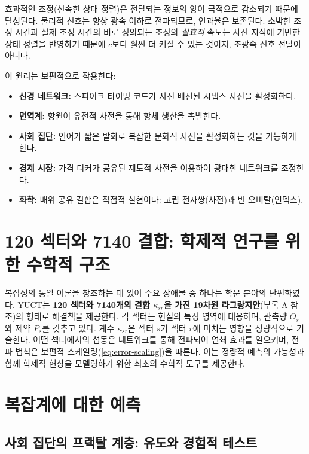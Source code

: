 \documentclass[11pt,a4paper]{article}
\theoremstyle{remark}
\begin{document}
	효과적인 조정(신속한 상태 정렬)은 전달되는 정보의 양이 극적으로 감소되기 때문에 달성된다. 물리적 신호는 항상 광속 이하로 전파되므로, 인과율은 보존된다. 소박한 조정 시간과 실제 조정 시간의 비로 정의되는 조정의 \emph{실효적} 속도는 사전 지식에 기반한 상태 정렬을 반영하기 때문에 \(c\)보다 훨씬 더 커질 수 있는 것이지, 초광속 신호 전달이 아니다.
	
	이 원리는 보편적으로 작용한다:
	\begin{itemize}
		\item \textbf{신경 네트워크:} 스파이크 타이밍 코드가 사전 배선된 시냅스 사전을 활성화한다.
		\item \textbf{면역계:} 항원이 유전적 사전을 통해 항체 생산을 촉발한다.
		\item \textbf{사회 집단:} 언어가 짧은 발화로 복잡한 문화적 사전을 활성화하는 것을 가능하게 한다.
		\item \textbf{경제 시장:} 가격 티커가 공유된 제도적 사전을 이용하여 광대한 네트워크를 조정한다.
		\item \textbf{화학:} 배위 공유 결합은 직접적 실현이다: 고립 전자쌍(사전)과 빈 오비탈(인덱스).
	\end{itemize}
	
	\section{120 섹터와 7140 결합: 학제적 연구를 위한 수학적 구조}
	\label{sec:sectors}
	
	복잡성의 통일 이론을 창조하는 데 있어 주요 장애물 중 하나는 학문 분야의 단편화였다. YUCT는 \textbf{120 섹터와 7140개의 결합 \(\kappa_{sr}\)을 가진 19차원 라그랑지안}(부록 A 참조)의 형태로 해결책을 제공한다. 각 섹터는 현실의 특정 영역에 대응하며, 관측량 \(O_s\)와 제약 \(P_s\)를 갖추고 있다. 계수 \(\kappa_{sr}\)은 섹터 \(s\)가 섹터 \(r\)에 미치는 영향을 정량적으로 기술한다. 어떤 섹터에서의 섭동은 네트워크를 통해 전파되어 연쇄 효과를 일으키며, 전파 법칙은 보편적 스케일링(\ref{eq:error-scaling})을 따른다. 이는 정량적 예측의 가능성과 함께 학제적 현상을 모델링하기 위한 최초의 수학적 도구를 제공한다.
	
	\section{복잡계에 대한 예측}
	\label{sec:predictions}
	
	\subsection{사회 집단의 프랙탈 계층: 유도와 경험적 테스트}
	\label{sec:social_scaling}
	
\end{document}
